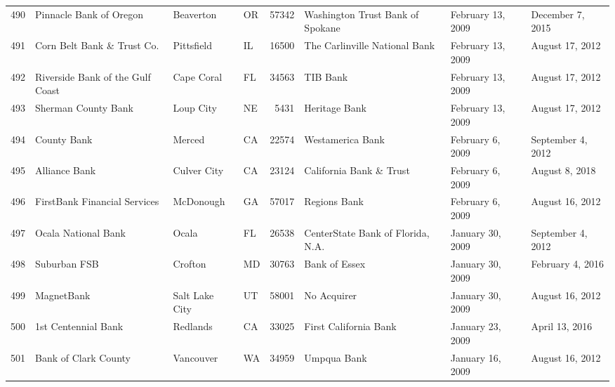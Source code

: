 \begin{tabular}{llllrlll}
490 &                            Pinnacle Bank of Oregon &           Beaverton &  OR &  57342 &                   Washington Trust Bank of Spokane &   February 13, 2009 &    December 7, 2015 \\
491 &                         Corn Belt Bank \& Trust Co. &          Pittsfield &  IL &  16500 &                      The Carlinville National Bank &   February 13, 2009 &     August 17, 2012 \\
492 &                   Riverside Bank of the Gulf Coast &          Cape Coral &  FL &  34563 &                                           TIB Bank &   February 13, 2009 &     August 17, 2012 \\
493 &                                Sherman County Bank &           Loup City &  NE &   5431 &                                      Heritage Bank &   February 13, 2009 &     August 17, 2012 \\
494 &                                        County Bank &              Merced &  CA &  22574 &                                   Westamerica Bank &    February 6, 2009 &   September 4, 2012 \\
495 &                                      Alliance Bank &         Culver City &  CA &  23124 &                            California Bank \& Trust &    February 6, 2009 &      August 8, 2018 \\
496 &                       FirstBank Financial Services &           McDonough &  GA &  57017 &                                       Regions Bank &    February 6, 2009 &     August 16, 2012 \\
497 &                                Ocala National Bank &               Ocala &  FL &  26538 &                  CenterState Bank of Florida, N.A. &    January 30, 2009 &   September 4, 2012 \\
498 &                                       Suburban FSB &             Crofton &  MD &  30763 &                                      Bank of Essex &    January 30, 2009 &    February 4, 2016 \\
499 &                                         MagnetBank &      Salt Lake City &  UT &  58001 &                                        No Acquirer &    January 30, 2009 &     August 16, 2012 \\
500 &                                1st Centennial Bank &            Redlands &  CA &  33025 &                              First California Bank &    January 23, 2009 &      April 13, 2016 \\
501 &                               Bank of Clark County &           Vancouver &  WA &  34959 &                                        Umpqua Bank &    January 16, 2009 &     August 16, 2012 \\

\end{tabular}
